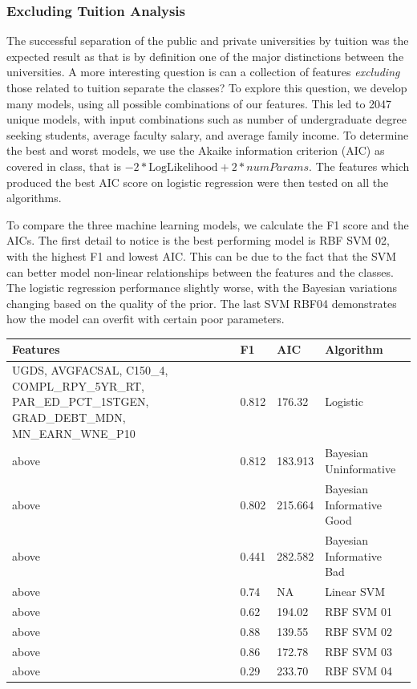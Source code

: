 \documentclass[10pt]{article}
\begin{document}
\subsubsection{Excluding Tuition Analysis}

The successful separation of the public and private universities by tuition was the expected result as that is by definition one of the major distinctions between the universities. A more interesting question is can a collection of features \textit{excluding} those related to tuition separate the classes? To explore this question, we develop many models, using all possible combinations of our features. This led to 2047 unique models, with input combinations such as number of undergraduate degree seeking students, average faculty salary, and average family income. To determine the best and worst models, we use the Akaike information criterion (AIC) as covered in class, that is $-2*\text{LogLikelihood} + 2*numParams$. The features which produced the best AIC score on logistic regression were then tested on all the algorithms.

To compare the three machine learning models, we calculate the F1 score and the AICs. The first detail to notice is the best performing model is RBF SVM 02, with the highest F1 and lowest AIC. This can be due to the fact that the SVM can better model non-linear relationships between the features and the classes. The logistic regression performance slightly worse, with the Bayesian variations changing based on the quality of the prior. The last SVM RBF04 demonstrates how the model can overfit with certain poor parameters.

\begin{center}
\begin{tabular}{ |P{4cm}|P{2cm}|P{2cm}|P{2cm}| }
 \hline Features & F1 & AIC & Algorithm \\ \hline
 UGDS, AVGFACSAL, C150\_4, COMPL\_RPY\_5YR\_RT, PAR\_ED\_PCT\_1STGEN, GRAD\_DEBT\_MDN, MN\_EARN\_WNE\_P10 & 0.812 & 176.32 & Logistic \\ \hline 
 above & 0.812 & 183.913 & Bayesian Uninformative \\ \hline 
 above & 0.802 & 215.664 & Bayesian Informative Good \\ \hline 
 above & 0.441 & 282.582 & Bayesian Informative Bad \\ \hline 
 above & 0.74 & NA & Linear SVM \\ \hline 
 above & 0.62 & 194.02 & RBF SVM 01\\ \hline
 above & 0.88 & 139.55 & RBF SVM 02 \\ \hline
 above & 0.86 & 172.78 & RBF SVM 03 \\ \hline
 above & 0.29 & 233.70 & RBF SVM 04 \\ \hline
\end{tabular}
\end{center}
\end{document}
